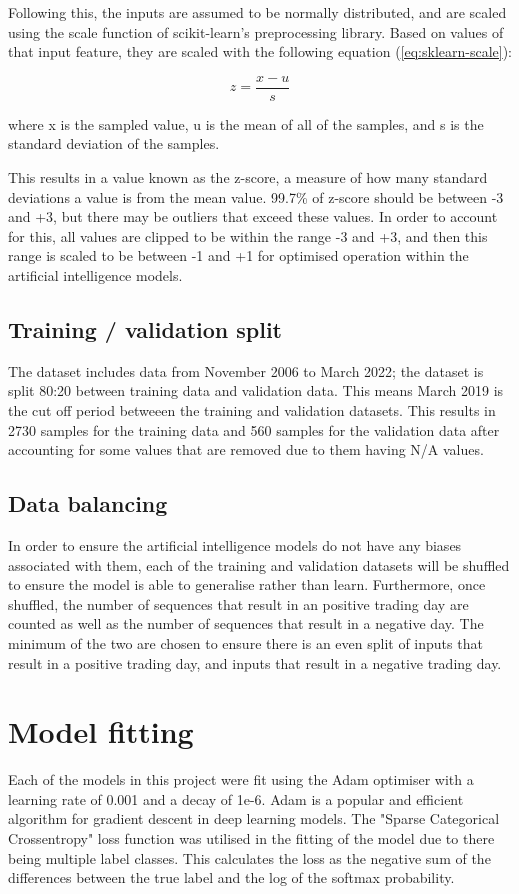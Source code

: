 Following this, the inputs are assumed to be normally distributed, and are scaled using the scale function of
scikit-learn's preprocessing library. Based on values of that input feature, they are scaled with the following
equation (\autoref{eq:sklearn-scale}):

\begin{equation}
    z = \frac{x - u}{s}
    \label{eq:sklearn-scale}
\end{equation}

where x is the sampled value, u is the mean of all of the samples, and s is the standard deviation of the samples.

This results in a value known as the z-score, a measure of how many standard deviations a value is from the mean value.
99.7\% of z-score should be between -3 and +3, but there may be outliers that exceed these values. In order to account for this,
all values are clipped to be within the range -3 and +3, and then this range is scaled to be between -1 and +1 for optimised
operation within the artificial intelligence models.

\subsection{Training / validation split}
The dataset includes data from November 2006 to March 2022; the dataset is split 80:20 between training data and
validation data. This means March 2019 is the cut off period betweeen the training and validation datasets. This
results in 2730 samples for the training data and 560 samples for the validation data after accounting for some
values that are removed due to them having N/A values.

\subsection{Data balancing}
In order to ensure the artificial intelligence models do not have any biases associated with them, each of the training
and validation datasets will be shuffled to ensure the model is able to generalise rather than learn. Furthermore, once
shuffled, the number of sequences that result in an positive trading day are counted as well as the number of sequences that result in
a negative day. The minimum of the two are chosen to ensure there is an even split of inputs that result in a positive trading day,
and inputs that result in a negative trading day.

\section{Model fitting}\label{sec:model_fitting}
Each of the models in this project were fit using the Adam optimiser with a learning rate of 0.001 and a decay of
1e-6. Adam is a popular and efficient algorithm for gradient descent in deep learning models.
The "Sparse Categorical Crossentropy" loss function was utilised in the fitting of the model due to there being multiple
label classes. This calculates the loss as the negative sum of the differences between the true label and the log of the softmax
probability.

